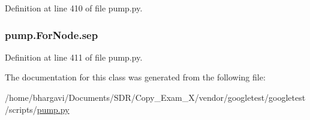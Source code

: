 Definition at line 410 of file pump.\+py.

\subsubsection[{\texorpdfstring{sep}{sep}}]{\setlength{\rightskip}{0pt plus 5cm}pump.\+For\+Node.\+sep}\hypertarget{classpump_1_1_for_node_a06b493278b3c1ad53363a2bcc3b8efb3}{}\label{classpump_1_1_for_node_a06b493278b3c1ad53363a2bcc3b8efb3}


Definition at line 411 of file pump.\+py.



The documentation for this class was generated from the following file\+:\begin{DoxyCompactItemize}
\item 
/home/bhargavi/\+Documents/\+S\+D\+R/\+Copy\+\_\+\+Exam\+\_\+X/vendor/googletest/googletest/scripts/\hyperlink{pump_8py}{pump.\+py}\end{DoxyCompactItemize}
